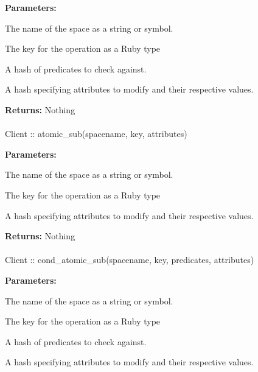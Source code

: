 \noindent\textbf{Parameters:}
\begin{description}[labelindent=\widthof{{predicates}},leftmargin=*,noitemsep,nolistsep,align=right]
\item[spacename] The name of the space as a string or symbol.
\item[key] The key for the operation as a Ruby type
\item[predicates] A hash of predicates to check against.
\item[attributes] A hash specifying attributes to modify and their respective values.
\end{description}

\noindent\textbf{Returns:}
Nothing

\paragraph{}
\begin{ccode}
Client :: atomic_sub(spacename, key, attributes)
\end{ccode}
\funcdesc 

\noindent\textbf{Parameters:}
\begin{description}[labelindent=\widthof{{attributes}},leftmargin=*,noitemsep,nolistsep,align=right]
\item[spacename] The name of the space as a string or symbol.
\item[key] The key for the operation as a Ruby type
\item[attributes] A hash specifying attributes to modify and their respective values.
\end{description}

\noindent\textbf{Returns:}
Nothing

\paragraph{}
\begin{ccode}
Client :: cond_atomic_sub(spacename, key, predicates, attributes)
\end{ccode}
\funcdesc 

\noindent\textbf{Parameters:}
\begin{description}[labelindent=\widthof{{predicates}},leftmargin=*,noitemsep,nolistsep,align=right]
\item[spacename] The name of the space as a string or symbol.
\item[key] The key for the operation as a Ruby type
\item[predicates] A hash of predicates to check against.
\item[attributes] A hash specifying attributes to modify and their respective values.
\end{description}

